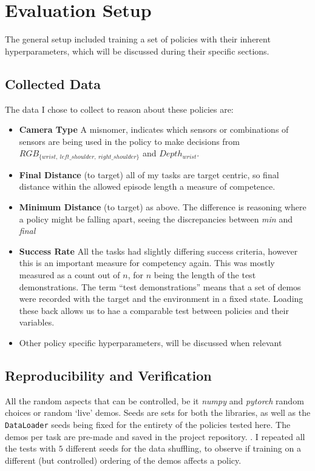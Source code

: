 \section{Evaluation Setup}
The general setup included training a set of policies with their inherent hyperparameters, which will be discussed during their specific sections.

\subsection{Collected Data}
The data I chose to collect to reason about these policies are:
\begin{itemize}
  \item \textbf{Camera Type} A misnomer, indicates which sensors or combinations of sensors are being used in the policy to make decisions from \({RGB}_{ \{wrist, ~left\_shoulder, ~right\_shoulder \} }\) and \(Depth_{wrist}\).
  \item \textbf{Final Distance} (to target) all of my tasks are target centric, so final distance within the allowed episode length a measure of competence.
  \item \textbf{Minimum Distance} (to target) as above. The difference is reasoning where a policy might be falling apart, seeing the discrepancies between \emph{min} and \emph{final}
  \item \textbf{Success Rate} All the tasks had slightly differing success criteria, however this is an important measure for competency again. This was mostly measured as a count out of $n$, for $n$ being the length of the test demonstrations. The term ``test demonstrations'' means that a set of demos were recorded with the target and the environment in a fixed state. Loading these back allows us to hae a comparable test between policies and their variables.
  \item Other policy specific hyperparameters, will be discussed when relevant
\end{itemize}

\subsection{Reproducibility and Verification}
All the random aspects that can be controlled, be it \emph{numpy} and \emph{pytorch} random choices or random `live' demos. Seeds are sets for both the libraries, as well as the \verb|DataLoader| seeds being fixed for the entirety of the policies tested here.
The demos per task are pre-made and saved in the project repository. . I repeated all the tests with $5$ different seeds for the data shuffling, to observe if training on a different (but controlled) ordering of the demos affects a policy.

